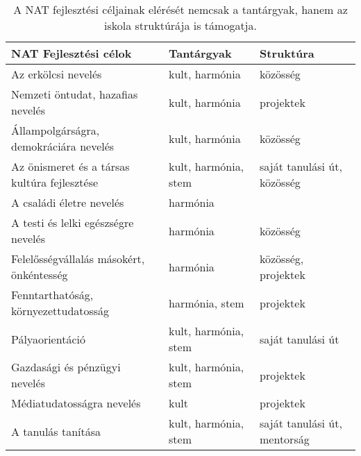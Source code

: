 \begin{table}

  \begin{tabular}{p{5cm}|>{\raggedright}p{3cm}|p{3cm}}

    \textbf{NAT Fejlesztési célok}               & \textbf{Tantárgyak}  & \textbf{Struktúra}           \\
    \hline
    Az erkölcsi nevelés                          & kult, harmónia       & közösség                     \\ \hline
    Nemzeti öntudat, hazafias nevelés            & kult, harmónia       & projektek                    \\ \hline
    Állampolgárságra, demokráciára nevelés       & kult, harmónia       & közösség                     \\ \hline
    Az önismeret és a társas kultúra fejlesztése & kult, harmónia, stem & saját
    tanulási út, közösség                                                                              \\ \hline
    A családi életre nevelés                     & harmónia             &                              \\ \hline
    A testi és lelki egészségre nevelés          & harmónia             & közösség                     \\ \hline
    Felelősségvállalás másokért, önkéntesség     & harmónia             & közösség, pro\-jek\-tek      \\
    \hline
    Fenntarthatóság, környezettudatosság         & harmónia, stem       & projektek                    \\ \hline
    Pályaorientáció                              & kult, harmónia, stem & saját tanulási út            \\ \hline
    Gazdasági és pénzügyi nevelés                & kult, harmónia, stem & projektek                    \\ \hline
    Médiatudatosságra nevelés                    & kult                 & projektek                    \\ \hline
    A tanulás tanítása                           & kult, harmónia, stem & saját tanulási út, mentorság \\

  \end{tabular}
  \caption{A NAT fejlesztési céljainak elérését nemcsak a tantárgyak, hanem az
    iskola struktúrája is támogatja.}
  \label{tbl:nat_fejlesztesi}
\end{table}

